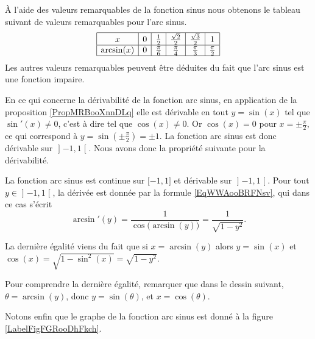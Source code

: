 À l'aide des valeurs remarquables de la fonction sinus nous obtenons le tableau suivant de valeurs remarquables pour l'arc sinus.
\begin{equation*}
    \begin{array}[]{|c|c|c|c|c|c|}
        \hline
        x&0&\frac{ 1 }{2}&\frac{ \sqrt{2} }{2}&\frac{ \sqrt{3} }{2}&1\\
          \hline
          \arcsin(x)&0&\frac{ \pi }{ 6 }&\frac{ \pi }{ 4 }&\frac{ \pi }{ 3 }&\frac{ \pi }{ 2 }\\ 
          \hline 
           \end{array}
\end{equation*}
Les autres valeurs remarquables peuvent être déduites du fait que l'arc sinus est une fonction impaire.

En ce qui concerne la dérivabilité de la fonction arc sinus, en application de la proposition \ref{PropMRBooXnnDLq} elle est dérivable en tout \( y=\sin(x)\) tel que \( \sin'(x)\neq 0\), c'est à dire tel que \( \cos(x)\neq 0\). Or \( \cos(x)=0\) pour \( x=\pm\frac{ \pi }{2}\), ce qui correspond à \( y=\sin(\pm\frac{ \pi }{2})=\pm 1\). La fonction arc sinus est donc dérivable sur \( \mathopen] -1 , 1 \mathclose[\). Nous avons donc la propriété suivante pour la dérivabilité.

\begin{proposition}
    La fonction arc sinus est continue sur \( \mathopen[ -1 , 1 \mathclose]\) et dérivable sur \( \mathopen] -1 , 1 \mathclose[\). Pour tout \( y\in\mathopen] -1 , 1 \mathclose[\), la dérivée est donnée par la formule \eqref{EqWWAooBRFNsv}, qui dans ce cas s'écrit
        \begin{equation}
            \arcsin'(y)=\frac{1}{ \cos\big( \arcsin(y) \big) }=\frac{1}{ \sqrt{1-y^2} }.
        \end{equation}
\end{proposition}
La dernière égalité viens du fait que si $x=\arcsin(y)$ alors $y = \sin(x)$ et $\cos(x)= \sqrt{1-\sin^2(x)} = \sqrt{1-y^2}$. 

Pour comprendre la dernière égalité, remarquer que dans le dessin suivant, \( \theta=\arcsin(y)\), donc $y = \sin(\theta)$, et \( x=\cos(\theta)\).
\begin{center}
    
\end{center}

Notons enfin que le graphe de la fonction arc sinus est donné à la figure \ref{LabelFigFGRooDhFkch}. %
\newcommand{\CaptionFigFGRooDhFkch}{Le graphe de la fonction \( x\mapsto \arcsin(x)\)}


